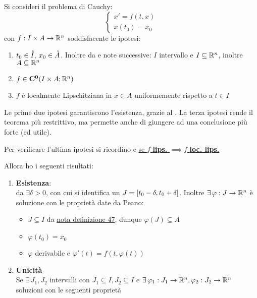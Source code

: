 \begin{theorem}
	\label{teo:cau_locale_part_1}
	Si consideri il problema di Cauchy:
	$$\begin{cases}x'=f(t,x)\\x(t_0)=x_0\end{cases}$$
	con $f:I\times A \to \mathbb{R}^n$ soddisfacente le ipotesi:
	\begin{enumerate}
		\item $t_0\in \accentset{\circ}{I},\:x_0\in \accentset{\circ}{A}$. Inoltre da  e note successive: $I$ intervallo e $I\subseteq \mathbb{R}^n$, inoltre $A\subseteq \mathbb{R}^n$
		\item $f\in \mathbf{C^{0}}(I\times A; \mathbb{R}^n)$ 
		\item $f$ è localmente Lipschitziana in $x\in A$ uniformemente rispetto a $t\in I$
	\end{enumerate}
	\begin{note}
		Le prime due ipotesi garantiscono l'esistenza, grazie al . La terza ipotesi rende il teorema più restrittivo, ma permette anche di giungere ad una conclusione più forte (ed utile).
	\end{note}
		\begin{note}
		Per verificare l'ultima ipotesi si ricordino  e \hyperlink{note:if_lips_then_loclips}{se $f$ \textbf{lips.} $\implies f$ \textbf{loc. lips.}}
	\end{note}
	Allora ho i seguenti risultati:
	\begin{enumerate}
		\item \textbf{Esistenza}:\\
		da  $\exists \delta>0$, con cui si identifica un $J=\left[t_0-\delta,t_0+\delta\right]$. Inoltre $\exists\,\varphi : J \to \mathbb{R}^n$ è soluzione con le proprietà date da Peano:
		\begin{itemize}
			\item $J\subseteq I$ da \hyperlink{note:diff_eq_sol_definit_set}{nota definizione 47}, dunque $\varphi(J)\subseteq A$
			\item $\varphi(t_0)=x_0$
			\item $\varphi$ derivabile e $\varphi'(t)=f(t,\varphi(t))$
		\end{itemize}
		\item \textbf{Unicità}\\
		Se $\exists\,J_1,J_2$ intervalli con $J_1\subseteq I,J_2\subseteq I$ e $\exists\,\varphi_1:J_1\to \mathbb{R}^n, \varphi_2:J_2\to \mathbb{R}^n$ soluzioni con le seguenti proprietà

\end{enumerate}
\end{theorem}

